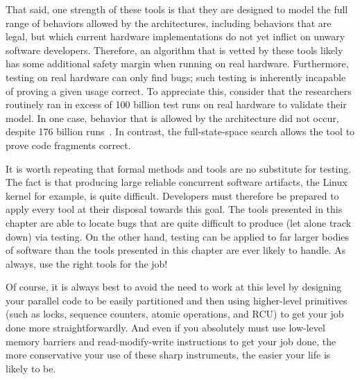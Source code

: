 That said, one strength of these tools is that they are designed to
model the full range of behaviors allowed by the architectures, including
behaviors that are legal, but which current hardware implementations do
not yet inflict on unwary software developers.
Therefore, an algorithm that is vetted by these tools likely has some
additional safety margin when running on real hardware.
Furthermore, testing on real hardware can only find bugs; such testing
is inherently incapable of proving a given usage correct.
To appreciate this, consider that the researchers routinely ran in excess
of 100 billion test runs on real hardware to validate their model.
In one case, behavior that is allowed by the architecture did not occur,
despite 176 billion runs~\cite{JadeAlglave2011ppcmem}.
In contrast, the
full-state-space search allows the tool to prove code fragments correct.

It is worth repeating that formal methods and tools are no substitute for
testing.
The fact is that producing large reliable concurrent software artifacts,
the Linux kernel for example, is quite difficult.
Developers must therefore be prepared to apply every tool at their
disposal towards this goal.
The tools presented in this chapter are able to locate bugs that are
quite difficult to produce (let alone track down) via testing.
On the other hand, testing can be applied to far larger bodies of software
than the tools presented in this chapter are ever likely to handle.
As always, use the right tools for the job!

Of course, it is always best to avoid the need to work at this level
by designing your parallel code to be easily partitioned and then
using higher-level primitives (such as locks, sequence counters, atomic
operations, and RCU) to get your job done more straightforwardly.
And even if you absolutely must use low-level memory barriers and
read-modify-write instructions to get your job done, the more
conservative your use of these sharp instruments, the easier your life
is likely to be.
